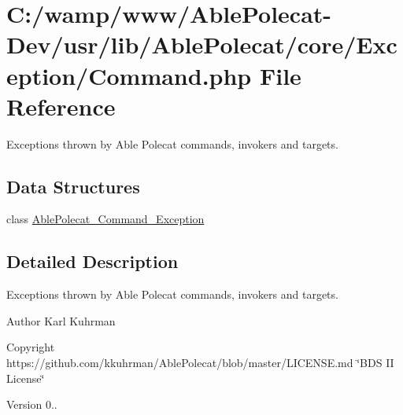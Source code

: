 \hypertarget{_exception_2_command_8php}{}\section{C\+:/wamp/www/\+Able\+Polecat-\/\+Dev/usr/lib/\+Able\+Polecat/core/\+Exception/\+Command.php File Reference}
\label{_exception_2_command_8php}


Exceptions thrown by Able Polecat commands, invokers and targets.  


\subsection*{Data Structures}
\begin{DoxyCompactItemize}
\item 
class \hyperlink{class_able_polecat___command___exception}{Able\+Polecat\+\_\+\+Command\+\_\+\+Exception}
\end{DoxyCompactItemize}


\subsection{Detailed Description}
Exceptions thrown by Able Polecat commands, invokers and targets. 

\begin{DoxyAuthor}{Author}
Karl Kuhrman 
\end{DoxyAuthor}
\begin{DoxyCopyright}{Copyright}
https\+://github.com/kkuhrman/\+Able\+Polecat/blob/master/\+L\+I\+C\+E\+N\+S\+E.\+md \char`\"{}\+B\+D\+S I\+I License\char`\"{} 
\end{DoxyCopyright}
\begin{DoxyVersion}{Version}
0.. 
\end{DoxyVersion}
